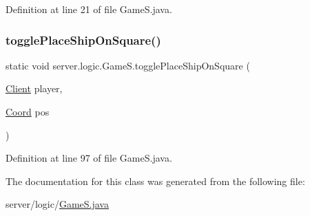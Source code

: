 Definition at line 21 of file Game\+S.\+java.

\hypertarget{classserver_1_1logic_1_1_game_s_a3c1375206147f2112c1e339e93166676}{}\label{classserver_1_1logic_1_1_game_s_a3c1375206147f2112c1e339e93166676} 
\subsubsection{\texorpdfstring{toggle\+Place\+Ship\+On\+Square()}{togglePlaceShipOnSquare()}}
{\footnotesize\ttfamily static void server.\+logic.\+Game\+S.\+toggle\+Place\+Ship\+On\+Square (\begin{DoxyParamCaption}\item[{\hyperlink{classserver_1_1conn_1_1_client}{Client}}]{player,  }\item[{\hyperlink{classsharedlib_1_1utils_1_1_coord}{Coord}}]{pos }\end{DoxyParamCaption})\hspace{0.3cm}{\ttfamily [static]}}



Definition at line 97 of file Game\+S.\+java.



The documentation for this class was generated from the following file\+:\begin{DoxyCompactItemize}
\item 
server/logic/\hyperlink{_game_s_8java}{Game\+S.\+java}\end{DoxyCompactItemize}
